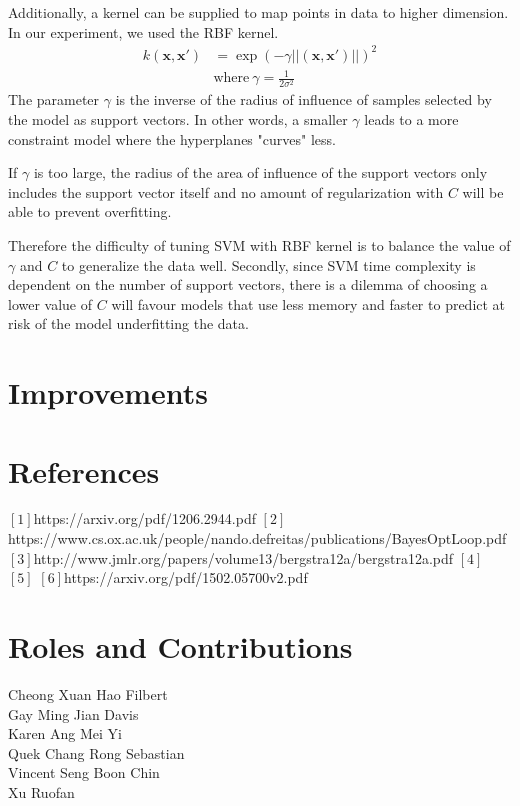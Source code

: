 \documentclass[letterpaper]{article}
\begin{document}
Additionally, a kernel can be supplied to map points in data to higher dimension. In our
experiment, we used the RBF kernel.
\begin{align*}
  k (\textbf{x},\textbf{x}') &= \exp(-\gamma||(\textbf{x},\textbf{x}')||)^2 \\
  &\text{where} \ \gamma = \frac{1}{2\sigma^2}
\end{align*}
The parameter $\gamma$ is the inverse of the radius of influence of samples selected by the
model as support vectors. In other words, a smaller $\gamma$ leads to a more constraint
model where the hyperplanes "curves" less.

If $\gamma$ is too large, the radius of the area of influence of the support vectors only
includes the support vector itself and no amount of regularization with $\textit{C}$ will be
able to prevent overfitting.

Therefore the difficulty of tuning SVM with RBF kernel is to balance the value of
$\gamma$ and $\textit{C}$ to generalize the data well. Secondly, since SVM time complexity
is dependent on the number of support vectors, there is a dilemma of choosing a lower value
of $\textit{C}$ will favour models that use less memory and faster to predict at risk of
the model underfitting the data.

\section{Improvements}

\section{References}
$[1]$https://arxiv.org/pdf/1206.2944.pdf  
$[2]$https://www.cs.ox.ac.uk/people/nando.defreitas/publications/BayesOptLoop.pdf  
$[3]$http://www.jmlr.org/papers/volume13/bergstra12a/bergstra12a.pdf  
$[4]$  
$[5]$
$[6]$https://arxiv.org/pdf/1502.05700v2.pdf
 

\section{Roles and Contributions}

\begin{description}
\item [Cheong Xuan Hao Filbert]
\item [Gay Ming Jian Davis]
\item [Karen Ang Mei Yi]
\item [Quek Chang Rong Sebastian]
\item [Vincent Seng Boon Chin]
\item [Xu Ruofan]
\end{description}
\end{document}
